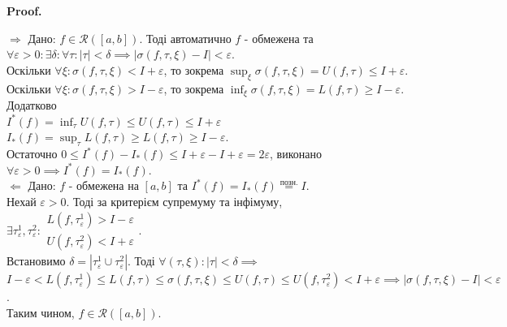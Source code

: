 \documentclass[a4paper, 10pt]{article}
\makeatletter
\def\huge{\displaystyle}
\def\qed{$\blacksquare$}
\def\rightproof{$\boxed{\Rightarrow}$ }
\def\leftproof{$\boxed{\Leftarrow}$ }
\theoremstyle{theoremdd}
\theoremstyle{theoremdd}
\theoremstyle{theoremdd}
\theoremstyle{theoremdd}
\theoremstyle{theoremdd}
\theoremstyle{theoremdd}
\theoremstyle{theoremdd}
\theoremstyle{theoremdd}
\theoremstyle{theoremdd}
\renewenvironment{proof}[1][Proof.\\]{\par
\pushQED{\hfill \qed}%
\normalfont \topsep6\p@\@plus6\p@\relax
\trivlist
\item\relax
{\bfseries
#1\@addpunct{.}}\hspace\labelsep\ignorespaces
}{%
\popQED\endtrivlist\@endpefalse
}
\makeatother
\begin{document}
\begin{proof}
\rightproof Дано: $f \in \mathcal{R}([a,b])$. Тоді автоматично $f$ - обмежена та\\
$\forall \varepsilon > 0: \exists \delta: \forall \tau: |\tau| < \delta \implies |\sigma(f, \tau, \xi) - I| < \varepsilon$.\\
Оскільки $\forall \xi: \sigma(f, \tau, \xi) < I + \varepsilon$, то зокрема $\huge\sup_{\xi} \sigma(f, \tau, \xi) = U(f,\tau) \leq I + \varepsilon$.\\
Оскільки $\forall \xi: \sigma(f, \tau, \xi) > I - \varepsilon$, то зокрема $\huge\inf_{\xi} \sigma(f, \tau, \xi) = L(f,\tau) \geq I - \varepsilon$.\\
Додатково \\
$I^*(f) = \huge\inf_\tau U(f,\tau) \leq U(f,\tau) \leq I + \varepsilon$\\
$I_*(f) = \huge\sup_\tau L(f,\tau) \geq L(f,\tau) \geq I - \varepsilon$.\\
Остаточно $0 \leq I^*(f) - I_*(f) \leq I+\varepsilon - I + \varepsilon = 2\varepsilon$, виконано $\forall \varepsilon > 0 \implies I^*(f) = I_*(f)$.
\bigskip \\
\leftproof Дано: $f$ - обмежена на $[a,b]$ та $I^*(f) = I_*(f) \overset{\text{позн.}}{=} I$.\\
Нехай $\varepsilon > 0$. Тоді за критерієм супремуму та інфімуму, $\exists \tau_\varepsilon^1, \tau_\varepsilon^2: \begin{gathered} L(f,\tau_\varepsilon^1) > I - \varepsilon \\ U(f,\tau_\varepsilon^2) < I+\varepsilon \end{gathered}$.\\
Встановимо $\delta = |\tau^1_\varepsilon \cup \tau^2_\varepsilon|$. Тоді $\forall (\tau,\xi): |\tau| < \delta \implies$\\
$I-\varepsilon < L(f,\tau_\varepsilon^1) \leq L(f,\tau) \leq \sigma(f,\tau,\xi) \leq U(f,\tau) \leq U(f,\tau_\varepsilon^2) < I+\varepsilon \implies |\sigma(f,\tau,\xi) - I| < \varepsilon$.\\
Таким чином, $f \in \mathcal{R}([a,b])$.
\end{proof}
\end{document}
